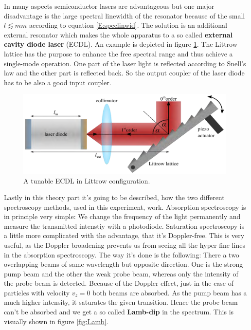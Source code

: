 In many aspects semiconductor lasers are advantageous but one major disadvantage is the large spectral linewidth of the resonator because of the small $l\lesssim mm$ according to equation \ref{E:speclinwid}. The solution is an additional external resonator which makes the whole apparatus to a so called \textbf{external cavity diode laser} (ECDL). An example is depicted in figure \ref{fig:ECDL}. The Littrow lattice has the purpose to enhance the free spectral range and thus achieve a single-mode operation. One part of the laser light is reflected according to Snell's law and the other part is reflected back. So the output coupler of the laser diode has to be also a good input coupler.

\begin{figure}[h]
    \centering
    \includegraphics[width=11cm]{ECDL.png}
    \caption{A tunable ECDL in Littrow configuration.}
    \label{fig:ECDL}
\end{figure}

Lastly in this theory part it's going to be described, how the two different spectroscopy methods, used in this experiment, work. Absorption spectroscopy is in principle very simple: We change the frequency of the light permanently and measure the transmitted intenstiy with a photodiode. Saturation spectroscopy is a little more complicated with the advantage, that it's Doppler-free. This is very useful, as the Doppler broadening prevents us from seeing all the hyper fine lines in the absorption spectroscopy. The way it's done is the following: There a two overlapping beams of same wavelength but opposite direction. One is the strong pump beam and the other the weak probe beam, whereas only the intensity of the probe beam is detected. Because of the Doppler effect, just in the case of particles with velocity $v_{z}=0$ both beams are absorbed. As the pump beam has a much higher intensity, it saturates the given transition. Hence the probe beam can't be absorbed and we get a so called \textbf{Lamb-dip} in the spectrum. This is visually shown in figure \ref{fig:Lamb}.

